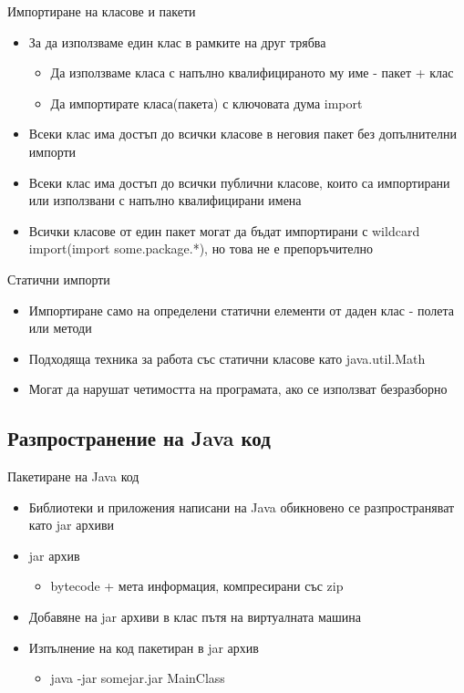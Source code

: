 \documentclass{beamer}
\begin{document}
\begin{frame}{Импортиране на класове и пакети}
  \transdissolve
  \begin{itemize}
  \item За да използваме един клас в рамките на друг трябва
    \begin{itemize}
      \item Да използваме класа с напълно квалифицираното му име - пакет + клас
      \item Да импортирате класа(пакета) с ключовата дума import
    \end{itemize}
  \item Всеки клас има достъп до всички класове в неговия пакет без
    допълнителни импорти \pause
  \item Всеки клас има достъп до всички публични класове, които са
    импортирани или използвани с напълно квалифицирани имена \pause
  \item Всички класове от един пакет могат да бъдат импортирани с
    wildcard import(import some.package.*), но това не е препоръчително
  \end{itemize}
\end{frame}

\begin{frame}{Статични импорти}
  \transdissolve
  \begin{itemize}
  \item Импортиране само на определени статични елементи от даден клас
    - полета или методи \pause
  \item Подходяща техника за работа със статични класове като
    java.util.Math \pause
  \item Могат да нарушат четимостта на програмата, ако се използват безразборно
  \end{itemize}
\end{frame}

\subsection{Разпространение на Java код}
\begin{frame}{Пакетиране на Java код}
  \transdissolve
  \begin{itemize}
  \item Библиотеки и приложения написани на Java обикновено се
    разпространяват като jar архиви \pause
  \item jar архив
    \begin{itemize}
    \item bytecode + мета информация, компресирани със zip
    \end{itemize} \pause
  \item Добавяне на jar архиви в клас пътя на виртуалната машина \pause
  \item Изпълнение на код пакетиран в jar архив
    \begin{itemize}
    \item java -jar somejar.jar MainClass
    \end{itemize}
  \end{itemize}
\end{frame}
\end{document}
